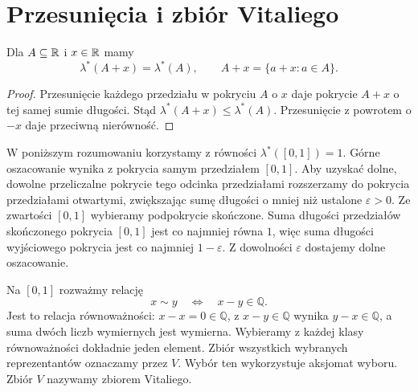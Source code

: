 \clearpage
{}
\znaczniklimbo
\section{Przesunięcia i zbiór Vitaliego}
\label{sec:vitali}

\begin{fakt}
\label{fakt:zewnetrzna-przesuniecia}
Dla $A\subseteq\mathbb{R}$ i $x\in\mathbb{R}$ mamy
\begin{equation}
  \lambda^{\ast}(A+x)=\lambda^{\ast}(A),
  \qquad A+x=\{a+x:a\in A\}.
  \label{eq:zewnetrzna-przesuniecia}
\end{equation}
\end{fakt}

\begin{proof}
Przesunięcie każdego przedziału w pokryciu $A$ o $x$ daje pokrycie
$A+x$ o tej samej sumie długości. Stąd
$\lambda^{\ast}(A+x)\leq\lambda^{\ast}(A)$.
Przesunięcie z powrotem o $-x$ daje przeciwną nierówność.
\end{proof}

\begin{uwaga}
\label{uw:dlugosc-przedzialu-vitali}
W poniższym rozumowaniu korzystamy z równości
$\lambda^{\ast}([0,1])=1$.
Górne oszacowanie wynika z pokrycia samym przedziałem $[0,1]$.
Aby uzyskać dolne, dowolne przeliczalne pokrycie tego odcinka przedziałami
rozszerzamy do pokrycia przedziałami otwartymi, zwiększając sumę długości
o mniej niż ustalone $\varepsilon>0$.
Ze zwartości $[0,1]$ wybieramy podpokrycie skończone.
Suma długości przedziałów skończonego pokrycia $[0,1]$ jest co najmniej
równa $1$, więc suma długości wyjściowego pokrycia jest co najmniej
$1-\varepsilon$. Z dowolności $\varepsilon$ dostajemy dolne oszacowanie.
\end{uwaga}

\begin{przyklad}
\label{prz:vitali}
Na $[0,1]$ rozważmy relację
\begin{equation}
  x\sim y\quad\Longleftrightarrow\quad x-y\in\mathbb{Q}.
  \label{eq:relacja-vitaliego}
\end{equation}
Jest to relacja równoważności: $x-x=0\in\mathbb{Q}$,
z $x-y\in\mathbb{Q}$ wynika $y-x\in\mathbb{Q}$,
a suma dwóch liczb wymiernych jest wymierna.
Wybieramy z każdej klasy równoważności dokładnie jeden element.
Zbiór wszystkich wybranych reprezentantów oznaczamy przez $V$.
Wybór ten wykorzystuje aksjomat wyboru. Zbiór $V$ nazywamy zbiorem Vitaliego.
\end{przyklad}

